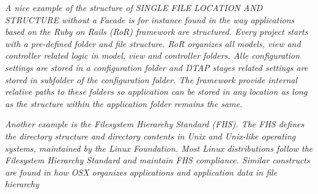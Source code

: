 \textit{A nice example of the structure of SINGLE FILE LOCATION AND STRUCTURE 
 without a {\sc Facade} is for instance found in the way applications based on the Ruby on Rails (RoR) framework are structured. Every project starts with a pre-defined folder and file structure. RoR organizes all models, view and controller related logic in model, view and controller folders. Alle configuration settings are stored in a configuration folder and DTAP stages related settings are stored in subfolder of the configuration folder. The framework provide internal relative paths to these folders so application can be stored in any location as long as the structure within the application folder remains the same.}

\textit{Another example is the Filesystem Hierarchy Standard (FHS). The FHS defines the directory structure and directory contents in Unix and Unix-like operating systems, maintained by the Linux Foundation. Most Linux distributions follow the Filesystem Hierarchy Standard and maintain FHS compliance. Similar constructs are found in how OSX organizes applications and application data in file hierarchy}

